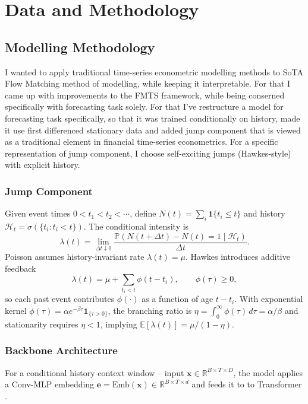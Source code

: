 \chapter{Data and Methodology}

\section{Modelling Methodology}

I wanted to apply traditional time-series econometric modelling methods to SoTA Flow Matching method of modelling, while keeping it interpretable. For that I came up with improvements to the FMTS framework, while being conserned specifically with forecasting task solely. For that I've restructure a model for forecasting task specifically, so that it was trained conditionally on history, made it use first differenced stationary data and added jump component that is viewed as a traditional element in financial time-series econometrics. For a specific representation of jump component, I choose self-exciting jumps (Hawkes-style) with explicit history.

\subsection{Jump Component}

Given event times $0<t_1<t_2<\cdots$, define $N(t)=\sum_i \mathbf{1}\{t_i\le t\}$ and history
$\mathcal{H}_t=\sigma(\{t_i:t_i<t\})$. The conditional intensity is
\[
\lambda(t)=\lim_{\Delta t\downarrow 0}\frac{\mathbb{P}(N(t+\Delta t)-N(t)=1\mid \mathcal{H}_t)}{\Delta t}.
\]
Poisson assumes history-invariant rate $\lambda(t)=\mu$. Hawkes introduces additive feedback
\[
\lambda(t)=\mu+\sum_{t_i<t}\phi(t-t_i),\qquad \phi(\tau)\ge 0,
\]
so each past event contributes $\phi(\cdot)$ as a function of age $t-t_i$. With exponential kernel
$\phi(\tau)=\alpha e^{-\beta\tau}\mathbf{1}_{\{\tau>0\}}$, the branching ratio is
$\eta=\int_0^\infty \phi(\tau)\,d\tau=\alpha/\beta$ and stationarity requires $\eta<1$, implying
$\mathbb{E}[\lambda(t)]=\mu/(1-\eta)$. \cite{hawkes1971spectra,daley2003point,laub2015hawkes}

\subsection{Backbone Architecture}

For a conditional history context window -- input $\mathbf{x}\in\mathbb{R}^{B\times T\times D}$, the model applies a Conv-MLP
embedding $\mathbf{e}=\mathrm{Emb}(\mathbf{x})\in\mathbb{R}^{B\times T\times d}$ and feeds it to
to Transformer \cite{vaswani2017attention}. 


